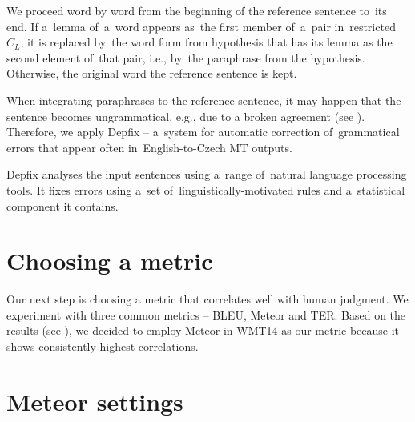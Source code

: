 We proceed word by word from the beginning of the reference sentence to~its end. If 
a~lemma of~a~word appears as~the first member of~a~pair in~restricted $ C_{L} $, it is 
replaced by~the word form from hypothesis that has its lemma as the second element of~that pair,
i.e., by~the paraphrase from the hypothesis. Otherwise, the original word the reference 
sentence is kept.

When integrating paraphrases to the reference sentence, it may happen that the sentence
becomes ungrammatical, e.g., due to a broken agreement (see ). Therefore, we apply
Depfix \cite{depfix} -- a~system for automatic correction of~grammatical errors that 
appear often in~English-to-Czech MT outputs. 

Depfix analyses the input sentences using a~range of~natural language processing tools. It
fixes errors using a~set of~linguistically-motivated rules and a~statistical component 
it contains.

\section{Choosing a metric}
Our next step is choosing a metric that correlates well with human judgment.
We experiment with three common metrics -- BLEU, Meteor and TER. Based on the results 
(see ), we decided to employ Meteor in WMT14 as our metric because
it shows consistently highest correlations.

\section{Meteor settings} 

\begin{table*}[htb]
\begin{center}

\caption{Different paraphrase tables for Meteor and their size (number of paraphrase pairs).}
\label{meteory}
\end{center}
\end{table*}

